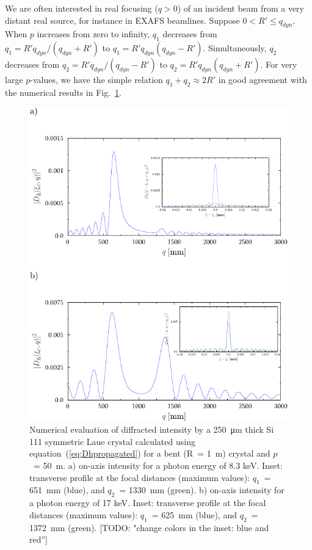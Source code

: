 \documentclass[preprint]{iucr}              %
\newcommand{\todo}[1]{{\color{red}[TODO: "#1'']}}
\newcommand{\inred}[1]{{\color{red}#1}}
\begin{document}
We are often interested in real focusing ($q>0$) of an incident beam from a very distant real source, for instance in EXAFS beamlines. 
Suppose $0<R'\le q_{dyn}$. When $p$ increases from zero to infinity, $q_1$ decreases from $q_1=R'q_{dyn}/(q_{dyn}+R')$ to 
$q_1=R' q_{dyn}(q_{dyn}-R')$.
Simultaneously, $q_2$ decreases from $q_2=R'q_{dyn}/(q_{dyn}-R')$ to 
$q_2=R'q_{dyn}(q_{dyn}+R')$.
For very large $p$-values, we have the simple relation $q_1+q_2\approx 2R'$ \inred{in good agreement with the numerical results in Fig.~\ref{fig:8keV}.}

\begin{figure}
\label{fig:8keV}
\caption{Numerical evaluation of diffracted intensity by a \SI{250}{\micro\meter} thick Si 111 symmetric Laue crystal calculated using equation~(\ref{eq:Dhpropagated}) for a bent (R~= \SI{1}{\meter}) crystal and $p$~= \SI{50}{\meter}. 
a) on-axis intensity for a photon energy of 8.3 keV. 
Inset: transverse profile at the focal distances (maximum values):  
$q_1$~= \SI{651}{\milli\meter} (blue), and
$q_2$~= \SI{1330}{\milli\meter} (green).
b) on-axis intensity for a photon energy of 17 keV.
Inset: transverse profile at the focal distances (maximum values):
$q_1$~= \SI{625}{\milli\meter} (blue), and 
$q_2$~= \SI{1372}{\milli\meter} (green).
\todo{change colors in the inset: blue and red}
}
\includegraphics[width=1\textwidth]{fig5.pdf}


\end{figure}
\end{document}
